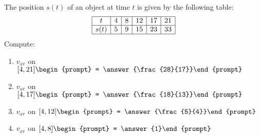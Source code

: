 \documentclass{ximera}
\author{Bart Snapp}
\begin{document}
\begin{exercise}
The position $s(t)$ of an object at time $t$ is given by the following table:
\[
\begin{array}{|c|c|c|c|c|c|}\hline
t &4 &8 &12 &17 &21 \\ \hline
s(t) &5 &9 & 15&23 & 33\\ \hline
\end{array}
\]
Compute:
\begin{enumerate}
\item $v_{\mathrm{av}}$ on $[4,21]\begin{prompt} = \answer{\frac{28}{17}}\end{prompt}$
\item $v_{\mathrm{av}}$ on $[4,17]\begin{prompt} = \answer{\frac{18}{13}}\end{prompt}$
\item $v_{\mathrm{av}}$ on $[4,12]\begin{prompt} = \answer{\frac{5}{4}}\end{prompt}$
\item $v_{\mathrm{av}}$ on $[4,8]\begin{prompt} = \answer{1}\end{prompt}$
\end{enumerate}
\end{exercise}
\end{document}
